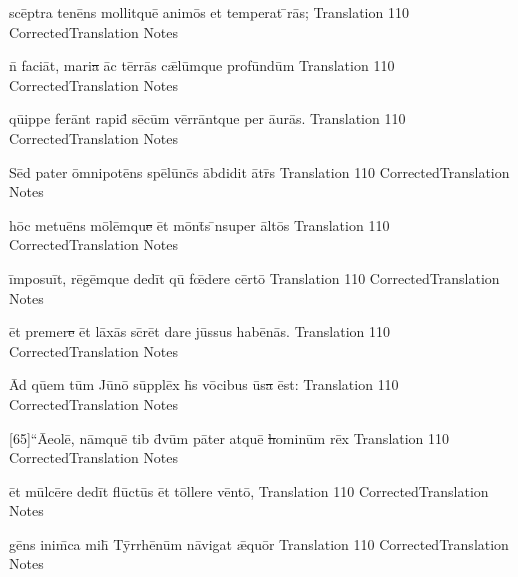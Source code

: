 \documentclass[]{book}
\begin{document}
\latline
  {sc\={\macron e}ptr\-a t\-en\={\macron e}ns m\-oll\-itqu\=e \-an\-im\={\macron o}s et temperat \={\macron {\i}}r\={\macron a}s;
}
  { Translation }
  {110}
  { CorrectedTranslation }
  { Notes }


\latline
  {n\={\macron {\i}} f\-ac\-i\=at, m\-ar\-i\sout{a }\=ac t\=err\={\macron a}s c\={\ae}l\=umqu\-e pr\-of\=und\=um
}
  { Translation }
  {110}
  { CorrectedTranslation }
  { Notes }

\newpage
\latline
  {q\={ui}pp\-e f\-er\=ant r\-ap\-id\={\macron {\i}} s\={\macron e}c\=um v\=err\=antqu\-e p\-er \={au}r\={\macron a}s.
}
  { Translation }
  {110}
  { CorrectedTranslation }
  { Notes }


\latline
  {S\=ed p\-at\-er \=omn\-ip\-ot\={\macron e}ns sp\={\macron e}l\=unc\={\macron {\i}}s \=abd\-id\-it \={\macron a}tr\={\macron {\i}}s
}
  { Translation }
  {110}
  { CorrectedTranslation }
  { Notes }


\latline
  {h\=oc m\-et\-u\={\macron e}ns m\={\macron o}l\=emqu\sout{e }\=et m\=ont\={\macron {\i}}s \={\macron {\i}}ns\-upe\-r \=alt\={\macron o}s
}
  { Translation }
  {110}
  { CorrectedTranslation }
  { Notes }

\newpage
\latline
  {\=imp\-os\-u\=it, r\={\macron e}g\=emqu\-e d\-ed\=it qu\={\macron {\i}} f\={\oe}d\-er\-e c\=ert\={\macron o}
}
  { Translation }
  {110}
  { CorrectedTranslation }
  { Notes }


\latline
  {\=et pr\-em\-er\sout{e }\=et l\=ax\={\macron a}s sc\={\macron {\i}}r\=et d\-ar\-e j\=uss\-us h\-ab\={\macron e}n\={\macron a}s.
}
  { Translation }
  {110}
  { CorrectedTranslation }
  { Notes }


\latline
  {\=Ad q\=uem t\=um J\={\macron u}n\={\macron o} s\=uppl\=ex h\={\macron {\i}}s v\={\macron o}c\-ib\-us \={\macron u}s\sout{a }\=est:
}
  { Translation }
  {110}
  { CorrectedTranslation }
  { Notes }

\newpage
\latline
  {[65]``\=A\-e\-ol\=e, n\=amqu\=e t\-ib\-{\macron {\i}} d\={\macron {\i}}v\=um p\=at\-er \-atqu\=e\sout{ h}\-om\-in\=um r\={\macron e}x
}
  { Translation }
  {110}
  { CorrectedTranslation }
  { Notes }


\latline
  {\=et m\=ulc\={\macron e}r\-e d\-ed\=it fl\={\macron u}ct\={\macron u}s \=et t\=oll\-er\-e v\=ent\={\macron o},
}
  { Translation }
  {110}
  { CorrectedTranslation }
  { Notes }


\latline
  {g\={\macron e}ns \-in\-im\={\macron {\i}}c\-a m\-ih\={\macron {\i}} T\=yrrh\={\macron e}n\=um n\={\macron a}v\-ig\-at \={\ae}qu\=or
}
  { Translation }
  {110}
  { CorrectedTranslation }
  { Notes }
\end{document}
